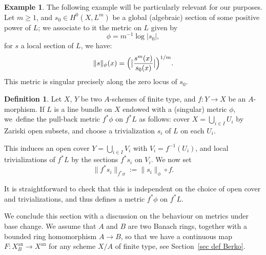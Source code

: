 \documentclass[JEP,XML,SOM,Unicode,published]{cedram}
\theoremstyle{definition}
\newtheorem{defn}[equation]{Definition}
\newtheorem{ex}[equation]{Example}
\newcommand{\an}{\mathrm{an}}
\begin{document}
\begin{ex} The following example will be particularly relevant for our purposes. Let $m \ge 1$, and $s_0 \in H^0(X, L^m)$ be a global (algebraic) section of some positive power of $L$; we associate to it the metric on $L$ given by
\[
\phi =m^{-1} \log \lvert s_0 \rvert,
\]
\ie for $s$ a local section of $L$, we have:
\[
\lVert s \rVert_{\phi}(x) = \Bigl(\bigl\lvert \frac{s^m(x)}{s_0(x)} \bigl\rvert\Bigr)^{1/m}.
\]
This metric is singular precisely along the zero locus of $s_0$.
\end{ex}
\begin{defn}
Let $X$, $Y$ be two $A$-schemes of finite type, and $f: Y \to X$ be an $A$-morphism. If $L$ is a line bundle on $X$ endowed with a (singular) metric $\phi$, we~define the pull-back metric $f^*\phi$ on $f^*L$ as follows: cover $X = \bigcup_{i \in I} U_i$ by Zariski open subsets, and choose a trivialization $s_i$ of $L$ on each $U_i$.

This induces an open cover $Y = \bigcup_{i \in I} V_i$ with $V_i = f^{-1}(U_i)$, and local trivializations of $f^*L$ by the sections $f^*s_i$ on $V_i$. We now set
\[
\lVert f^*s_i \rVert_{f^* \phi}:= \lVert s_i \rVert_{\phi} \circ f.
\]
\end{defn}
It is straightforward to check that this is independent on the choice of open cover and trivializations, and thus defines a metric $f^*\phi$ on $f^*L$.

We conclude this section with a discussion on the behaviour on metrics under base change. We assume that $A$ and $B$ are two Banach rings, together with a bounded ring homomorphism $A\to B$, so that we have a continuous map $F: X^{\an}_B \to X^{\an}$ for any scheme $X/A$ of finite type, see Section~\ref{sec def Berko}.
\end{document}
